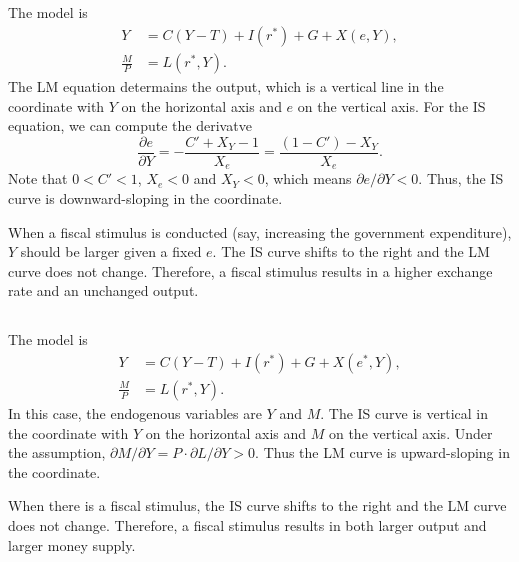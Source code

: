 \documentclass{article}
\begin{document}
\subsection{}
The model is
\begin{align*}
    Y &= C(Y - T) + I(r^\ast) + G + X(e, Y), \\
    \frac{M}{P} &= L(r^\ast, Y).
\end{align*}
The LM equation determains the output, which is a vertical line in the coordinate with $Y$ on the horizontal axis and $e$ on the vertical axis. For the IS equation, we can compute the derivatve
\[
    \frac{\partial e}{\partial Y} =
    - \frac{C' + X_Y - 1}{X_e} = \frac{(1 - C') - X_Y}{X_e}.
\]
Note that $0 < C' < 1$, $X_e < 0$ and $X_Y < 0$, which means $\partial e / \partial Y < 0$. Thus, the IS curve is downward-sloping in the coordinate.

When a fiscal stimulus is conducted (say, increasing the government expenditure), $Y$ should be larger given a fixed $e$. The IS curve shifts to the right and the LM curve does not change. Therefore, a fiscal stimulus results in a higher exchange rate and an unchanged output.

\subsection{}
The model is
\begin{align*}
    Y &= C(Y - T) + I(r^\ast) + G + X(e^\ast, Y), \\
    \frac{M}{P} &= L(r^\ast, Y).
\end{align*}
In this case, the endogenous variables are $Y$ and $M$. The IS curve is vertical in the coordinate with $Y$ on the horizontal axis and $M$ on the vertical axis. Under the assumption, $\partial M / \partial Y = P \cdot \partial L / \partial Y > 0$. Thus the LM curve is upward-sloping in the coordinate.

When there is a fiscal stimulus, the IS curve shifts to the right and the LM curve does not change. Therefore, a fiscal stimulus results in both larger output and larger money supply.

\section{}
\end{document}
